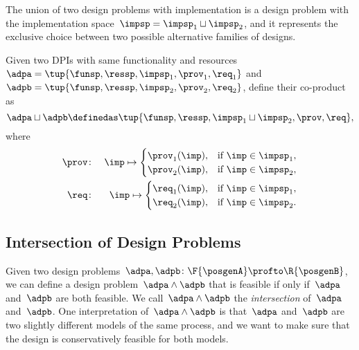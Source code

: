 The union of two design problems with implementation is a design problem with the implementation
space~$\impsp=\impsp_{1}\sqcup\impsp_{2}$, and it represents the
exclusive choice between two possible alternative families of designs.
\begin{definition}
    \label{def:parallel-1}Given two DPIs with same functionality and
    resources~$\adpa=\tup{\funsp,\ressp,\impsp_{1},\prov_{1},\req_{1}}$
    and~$\adpb=\tup{\funsp,\ressp,\impsp_{2},\prov_{2},\req_{2}}$,
    define their co-product as
    \begin{equation}
        \adpa\sqcup\adpb\definedas\tup{\funsp,\ressp,\impsp_{1}\sqcup\impsp_{2},\prov,\req} ,
    \end{equation}
    where
    \begin{eqnarray}
        \prov & \colon & \imp\mapsto\begin{cases}
                                        \prov_{1}(\imp), & \text{if }\imp\in\impsp_{1},\\
                                        \prov_{2}(\imp), & \text{if }\imp\in\impsp_{2},
        \end{cases}\label{eq:dppar-exec-1}\\
        \req & \colon & \imp\mapsto\begin{cases}
                                       \req_{1}(\imp), & \text{if }\imp\in\impsp_{1},\\
                                       \req_{2}(\imp), & \text{if }\imp\in\impsp_{2}.
        \end{cases}\nonumber
    \end{eqnarray}
\end{definition}

%

\begin{figure}[h!]
    \centering
    \caption{\label{fig:dpcoproduct}}
\end{figure}

\subsection{Intersection of Design Problems}

Given two design problems~$\adpa, \adpb \colon \F{\posgenA} \profto \R{\posgenB}$, we can define a design problem~$\adpa \wedge \adpb$ that is feasible if only if~$\adpa$ and~$\adpb$ are both feasible.
We call~$\adpa \wedge \adpb$ the \emph{intersection} of~$\adpa$ and~$\adpb$.
One interpretation of~$\adpa \wedge \adpb$ is that~$\adpa$ and~$\adpb$ are two slightly different models of the same process, and we want to make sure that the design is conservatively feasible for both models.

